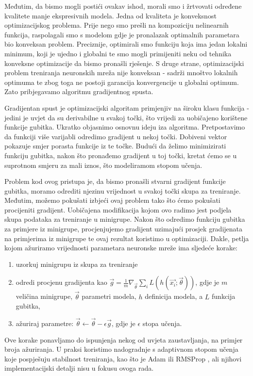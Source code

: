Međutim, da bismo mogli postići ovakav ishod, morali smo i žrtvovati određene kvalitete manje ekspresivnih modela. Jedna od kvaliteta je konveksnost optimizacijskog problema. Prije nego smo prešli na kompoziciju nelinearnih funkcija, raspolagali smo s modelom gdje je pronalazak optimalnih parametara bio konveksan problem. Preciznije, optimirali smo funkciju koja ima jedan lokalni minimum, koji je ujedno i globalni te smo mogli primijeniti neku od tehnika konveksne optimizacije da bismo pronašli rješenje. S druge strane, optimizacijski problem treniranja neuronskih mreža nije konveksan - sadrži mnoštvo lokalnih optimuma te zbog toga ne postoji garancija konvergencije u globalni optimum. Zato pribjegavamo algoritmu gradijentnog spusta.

Gradijentan spust je optimizacijski algoritam primjenjiv na široku klasu funkcija - jedini je uvjet da su derivabilne u svakoj točki, što vrijedi za uobičajeno korištene funkcije gubitka. Ukratko objasnimo osnovnu ideju iza algoritma. Pretpostavimo da funkciji više varijabli odredimo gradijent u nekoj točki. Dobiveni vektor pokazuje smjer porasta funkcije iz te točke. Budući da želimo minimizirati funkciju gubitka, nakon što pronađemo gradijent u toj točki, kretat ćemo se u suprotnom smjeru za mali iznos, što modeliramom stopom učenja. 

Problem kod ovog pristupa je, da bismo pronašli stvarni gradijent funkcije gubitka, moramo odrediti njezinu vrijednost u svakoj točki skupa za treniranje. Međutim, možemo pokušati izbjeći ovaj problem tako što ćemo pokušati procijeniti gradijent. Uobičajena modifikacija kojom ovo radimo jest podjela skupa podataka za treniranje u minigrupe. Nakon što odredimo funkciju gubitka za primjere iz minigrupe, procjenjujemo gradijent uzimajući prosjek gradijenata na primjerima iz minigrupe te ovaj rezultat koristimo u optimizaciji. Dakle, petlja kojom ažuriramo vrijednosti parametara neuronske mreže ima sljedeće korake:
\begin{enumerate}
	\item uzorkuj minigrupu iz skupa za treniranje
	\item odredi procjenu gradijenta kao $\vec{g} = \frac{1}{m}\nabla_{\vec{\theta}}\sum_i L(h(\vec{x_i}; \vec{\theta}))$, gdje je $m$ veličina minigrupe, $\vec{\theta}$ parametri modela, $h$ definicija modela, a $L$ funkcija gubitka,
	\item ažuriraj parametre: $\vec{\theta} \leftarrow \vec{\theta} - \epsilon\vec{g}$, gdje je $\epsilon$ stopa učenja.
\end{enumerate}
Ove korake ponavljamo do ispunjenja nekog od uvjeta zaustavljanja, na primjer broja ažuriranja. U praksi koristimo nadogradnje s adaptivnom stopom učenja koje pospješuju stabilnost treniranja, kao što je Adam  ili RMSProp , ali njihovi implementacijski detalji nisu u fokusu ovoga rada.